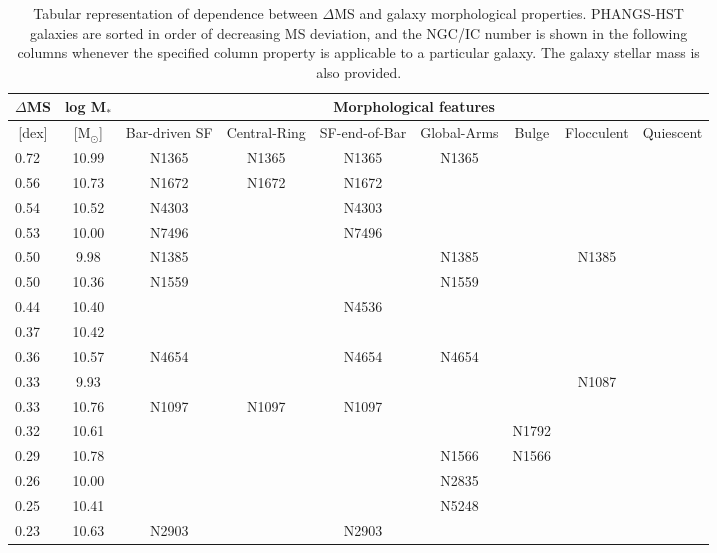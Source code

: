 %
\begin{table*}
\centering
\begin{center}
\caption{Tabular representation of dependence between $\Delta$MS and galaxy morphological properties. PHANGS-HST galaxies are sorted in order of decreasing MS deviation, and the NGC/IC number is shown in the following columns whenever the specified column property is applicable to a particular galaxy.  The galaxy stellar mass is also provided.}
\label{tab:DeltaMS}
\begin{threeparttable}
\begin{tabular}{lcccccccc}
\hline\hline
\multicolumn{1}{c}{$\Delta$MS} & \multicolumn{1}{c}{log M$_*$} & \multicolumn{7}{c}{Morphological features} \\ 
\hline
\multicolumn{1}{c}{[dex]} & \multicolumn{1}{c}{[M$_{\odot}$]} & \multicolumn{1}{c}{Bar-driven SF \tnote{a}} & 
\multicolumn{1}{c}{Central-Ring} & 
\multicolumn{1}{c}{SF-end-of-Bar \tnote{b}} & 
\multicolumn{1}{c}{Global-Arms \tnote{c}} & 
\multicolumn{1}{c}{Bulge \tnote{d}} & 
\multicolumn{1}{c}{Flocculent \tnote{e}} & 
\multicolumn{1}{c}{Quiescent \tnote{f}} \\ 
\hline
0.72 & 10.99 & N1365 & N1365 & N1365 & N1365 &  &  & \\
0.56 & 10.73 & N1672 & N1672 & N1672 &  &  &  & \\
0.54 & 10.52 & N4303 &  & N4303 &  &  &  & \\
0.53 & 10.00 & N7496 &  & N7496 &  &  &  & \\
0.50 & 9.98 & N1385 &  &  & N1385 &  & N1385 & \\
0.50 & 10.36 & N1559 &  &  & N1559 &  &  & \\
0.44 & 10.40 &  &  & N4536 &  &  &  & \\
0.37 & 10.42 &  &  &  &  &  &  & \\
0.36 & 10.57 & N4654 &  & N4654 & N4654 &  &  & \\
0.33 & 9.93 &  &  &  &  &  & N1087 & \\
0.33 & 10.76 & N1097 & N1097 & N1097 &  &  &  & \\
0.32 & 10.61 &  &  &  &  & N1792 &  & \\
0.29 & 10.78 &  &  &  & N1566 & N1566 &  & \\
0.26 & 10.00 &  &  &  & N2835 &  &  & \\
0.25 & 10.41 &  &  &  & N5248 &  &  & \\
0.23 & 10.63 & N2903 &  & N2903 &  &  &  & \\

\end{tabular}
\end{threeparttable}
\end{center}
\end{table*}

